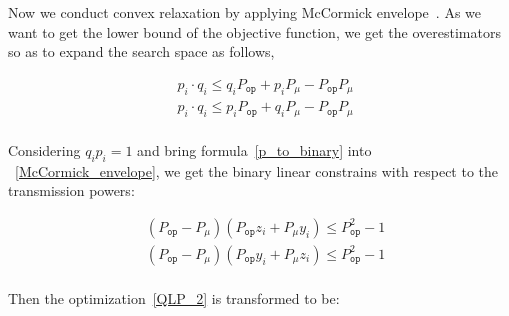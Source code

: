 \documentclass[times]{ettauth}
\theoremstyle{mytheoremstyle}
\theoremstyle{mytheoremstyle}
\theoremstyle{mytheoremstyle}
\begin{document}
Now we conduct convex relaxation by applying McCormick envelope~\cite{Gupte2012MixedIB}.
As we want to get the lower bound of the objective function, we get the overestimators so as to expand the search space as follows,

	\begin{equation}
	\label{McCormick_envelope}	
	\begin{aligned}
& p_i \cdot q_i  \leq q_i P_{\mathtt{op}} + p_i P_\mu - P_{\mathtt{op}}P_\mu\\
& p_i \cdot q_i   \leq p_i P_{\mathtt{op}} + q_i P_\mu - P_{\mathtt{op}}P_\mu\\
   \end{aligned}
	\end{equation}
	

	
	Considering $q_i  p_i =1$ and bring formula~\ref{p_to_binary} into ~\ref{McCormick_envelope}, we get the binary linear constrains with respect to the transmission powers:
	
		\begin{equation}
	\label{relaxation_power}	
	\begin{aligned}
	& (P_{\mathtt{op}} - P_\mu)(P_{\mathtt{op}} z_i + P_\mu y_i)  \leq P_{\mathtt{op}}^2 - 1\\
	& (P_{\mathtt{op}} - P_\mu)(P_{\mathtt{op}} y_i + P_\mu z_i)  \leq P_{\mathtt{op}}^2 - 1\\
   \end{aligned}
	\end{equation}	
	
Then the optimization~\ref{QLP_2} is transformed to be:
\end{document}
